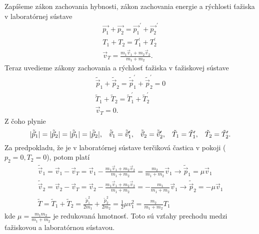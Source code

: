 \documentclass[../../main.tex]{subfiles}
\begin{document}
Zapíšeme zákon zachovania hybnosti, zákon zachovania energie a rýchlosti ťažiska v laboratórnej sústave
\begin{equation}
\begin{gathered}
\vec{p_1}+\vec{p_2}=\vec{p_1}^{\prime}+\vec{p_2}^{\prime} \\
T_1+T_2=T_1^{\prime}+T_2^{\prime} \\
\vec{v}_T=\frac{m_1\vec{v}_1+m_2\vec{v}_2}{m_1+m_2}.
\end{gathered}
\end{equation}
Teraz uvedieme zákony zachovania a rýchlosť ťažiska v ťažiskovej sústave
\begin{equation}
\begin{gathered}
\tilde{\vec{p}}_1+\tilde{\vec{p}}_2=\tilde{\vec{p}}_1^{\prime}+\tilde{\vec{p}}_2^{\prime}=0 \\
\tilde{T}_1+\tilde{T}_2=\tilde{T}_1^{\prime}+\tilde{T}_2^{\prime} \\
\vec{v}_T=0.
\end{gathered}
\end{equation}
Z čoho plynie $$ \lvert \tilde{\vec{p}}_1 \rvert=\lvert \tilde{\vec{p}}_2 \rvert=\lvert \tilde{\vec{p}}_1 \rvert=\lvert \tilde{\vec{p}}_2  \rvert, \hspace{0.3cm} \tilde{\vec{v}}_1=\tilde{\vec{v}}_1^{\prime}, \hspace{0.3cm} \tilde{\vec{v}}_2=\tilde{\vec{v}}_2^{\prime}, \hspace{0.3cm} \tilde{T}_1=\tilde{T}_1^{\prime}, \hspace{0.3 cm} \tilde{T}_2=\tilde{T}_2^{\prime}. $$
Za predpokladu, že je v laboratórnej sústave terčiková častica v pokoji ($p_2=0, T_2=0$), potom platí
\begin{equation}
\begin{gathered}
\tilde{\vec{v}}_1=\vec{v}_1-\vec{v}_T=\vec{v}_1-\frac{m_1\vec{v}_1+m_2\vec{v}_2}{m_1+m_2}=\frac{m_2}{m_1+m_2}\vec{v}_1\rightarrow \tilde{\vec{p}}_1=\mu \vec{v}_1 \\
\tilde{\vec{v}}_2=\vec{v}_2-\vec{v}_T=\vec{v}_2-\frac{m_1\vec{v}_1+m_2\vec{v}_2}{m_1+m_2}=-\frac{m_1}{m_1+m_2}\vec{v}_1\rightarrow \tilde{\vec{p}}_2=-\mu \vec{v}_1 \\
\tilde{T}=\tilde{T}_1+\tilde{T}_2=\frac{\tilde{p}_1^2}{2m_1}+\frac{\tilde{p}_2^2}{2m_2}=\frac{1}{2}\mu v_1^2=\frac{m_2}{m_1+m_2}T_1
\end{gathered}
\end{equation}
kde $\mu=\frac{m_1m_2}{m_1+m_2}$ je redukovaná hmotnosť. Toto sú vzťahy prechodu medzi ťažiskovou a laboratórnou sústavou.
\end{document}
